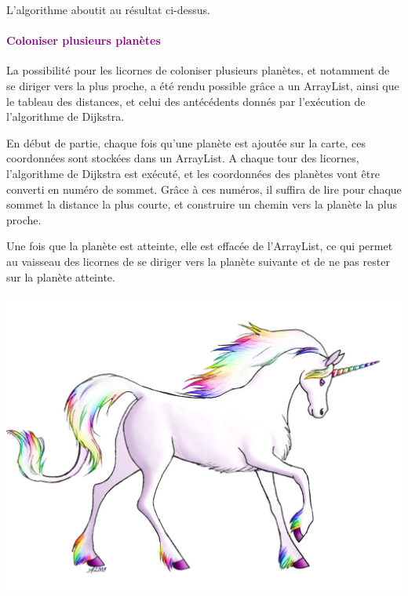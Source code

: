 \documentclass{report}
\begin{document}
      		L'algorithme aboutit au résultat ci-dessus.
      
			\paragraph{\textcolor{purple}{Coloniser plusieurs planètes}}
			La possibilité pour les licornes de coloniser plusieurs planètes, et notamment de se diriger vers la plus proche, a été rendu possible grâce a un ArrayList, ainsi que le tableau des distances, et celui des antécédents donnés par l'exécution de l'algorithme de Dijkstra.
			
			En début de partie, chaque fois qu'une planète est ajoutée sur la carte, ces coordonnées sont stockées dans un ArrayList. A chaque tour des licornes, l'algorithme de Dijkstra est exécuté, et les coordonnées des planètes vont être converti en numéro de sommet. Grâce à ces numéros, il suffira de lire pour chaque sommet la distance la plus courte, et construire un chemin vers la planète la plus proche.
			
			Une fois que la planète est atteinte, elle est effacée de l'ArrayList, ce qui permet au vaisseau des licornes de se diriger vers la planète suivante et de ne pas rester sur la planète atteinte.\\[3cm]
			\begin{center}
			\includegraphics[scale=1]{Images/Licornes.jpg}
			\end{center}
			
\end{document}
